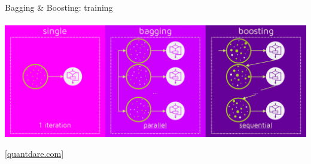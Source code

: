 \documentclass[handout]{beamer}
\newcommand{\hreftextsize}{\footnotesize}
\newcommand{\myhref}[2]{\href{#1}{\hreftextsize #2}}
\begin{document}
\begin{frame}{Bagging \& Boosting: training}
%

\begin{center}
	\includegraphics[width=\textwidth]{figs/bagg_boost_train}
	
	\myhref{https://quantdare.com/what-is-the-difference-between-bagging-and-boosting/}{[quantdare.com]}
\end{center}
\end{frame}
\end{document}

